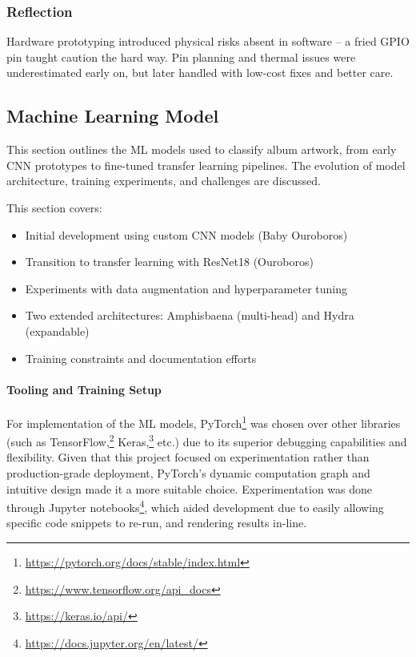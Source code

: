             \subsubsection*{Reflection}
                Hardware prototyping introduced physical risks absent in software -- a fried GPIO pin taught caution the hard way. Pin planning and thermal issues were underestimated early on, but later handled with low-cost fixes and better care.
    
      \subsection{Machine Learning Model} \label{sec:mlImp}
    
            This section outlines the ML models used to classify album artwork, from early CNN prototypes to fine-tuned transfer learning pipelines. The evolution of model architecture, training experiments, and challenges are discussed.
    
            This section covers:
            \begin{itemize}
              \item Initial development using custom CNN models (Baby Ouroboros)
              \item Transition to transfer learning with ResNet18 (Ouroboros)
              \item Experiments with data augmentation and hyperparameter tuning
              \item Two extended architectures: Amphisbaena (multi-head) and Hydra (expandable)
              \item Training constraints and documentation efforts
            \end{itemize}
    
            \paragraph{Tooling and Training Setup}
    
            For implementation of the ML models, PyTorch\footnote{\url{https://pytorch.org/docs/stable/index.html}} was chosen over other libraries (such as TensorFlow,\footnote{\url{https://www.tensorflow.org/api_docs}} Keras,\footnote{\url{https://keras.io/api/}} etc.) due to its superior debugging capabilities and flexibility. Given that this project focused on experimentation rather than production-grade deployment, PyTorch's dynamic computation graph and intuitive design made it a more suitable choice. Experimentation was done through Jupyter notebooks\footnote{\url{https://docs.jupyter.org/en/latest/}}, which aided development due to easily allowing specific code snippets to re-run, and rendering results in-line.
    
